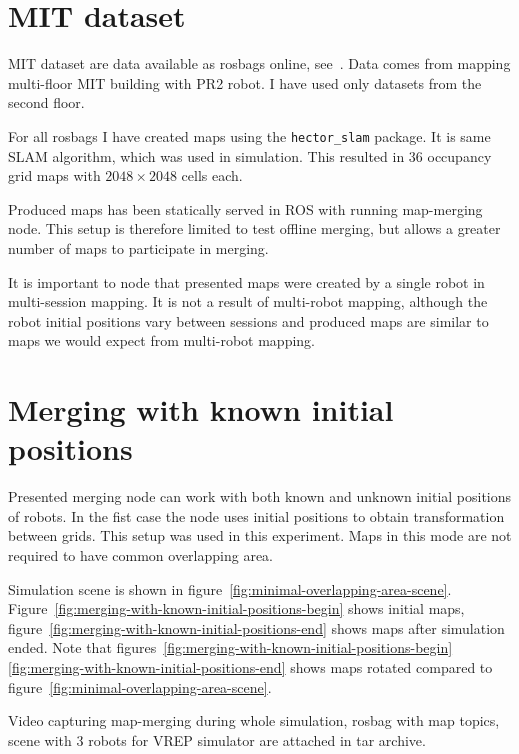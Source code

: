 \section{\gls{MIT} dataset}

\gls{MIT} dataset are data available as rosbags online, see~\cite{Fallon2013}. Data comes from mapping multi-floor \gls{MIT} building with PR2 robot. I have used only datasets from the second floor.

For all rosbags I have created maps using the \texttt{hector\_slam} package. It is same \gls{SLAM} algorithm, which was used in simulation. This resulted in $36$ occupancy grid maps with $2048 \times 2048$ cells each.

Produced maps has been statically served in \gls{ROS} with running map-merging node. This setup is therefore limited to test offline merging, but allows a greater number of maps to participate in merging.

It is important to node that presented maps were created by a single robot in multi-session mapping. It is not a result of multi-robot mapping, although the robot initial positions vary between sessions and produced maps are similar to maps we would expect from multi-robot mapping.

\section{Merging with known initial positions}
\label{sec:merging-with-known-initial-positions}

Presented merging node can work with both known and unknown initial positions of robots. In the fist case the node uses initial positions to obtain transformation between grids. This setup was used in this experiment. Maps in this mode are not required to have common overlapping area.

Simulation scene is shown in figure~\ref{fig:minimal-overlapping-area-scene}. Figure~\ref{fig:merging-with-known-initial-positions-begin} shows initial maps, figure~\ref{fig:merging-with-known-initial-positions-end} shows maps after simulation ended. Note that figures~\ref{fig:merging-with-known-initial-positions-begin} \ref{fig:merging-with-known-initial-positions-end} shows maps rotated compared to figure~\ref{fig:minimal-overlapping-area-scene}.

Video capturing map-merging during whole simulation, rosbag with map topics, scene with $3$ robots for \gls{VREP} simulator are attached in tar archive.


